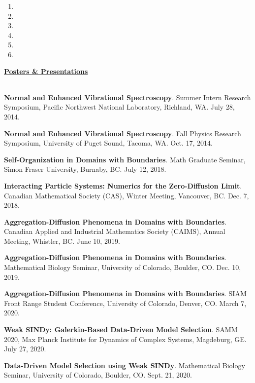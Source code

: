 \documentclass[letterpaper,11pt,oneside]{article}
\newcommand{\headr}[1]{\vspace{10pt}\uline{\Large{\textbf{#1}} \hfill } \\ \vspace{-10pt}\\}
\begin{document}
\begin{enumerate}
\item {}
\item {}
\item {}
\item {}
\item {}
\item {}
\end{enumerate}


%

\headr{Posters \& Presentations}

\begin{enumerate}[label={[\arabic*]}]
\item \textbf{Normal and Enhanced Vibrational Spectroscopy}. Summer Intern Research Symposium, Pacific Northwest National Laboratory, Richland, WA. July 28, 2014.
\item \textbf{Normal and Enhanced Vibrational Spectroscopy}. Fall Physics Research Symposium, University of Puget Sound, Tacoma, WA. Oct. 17, 2014.
\item \textbf{Self-Organization in Domains with Boundaries}. Math Graduate Seminar, Simon Fraser University, Burnaby, BC. July 12, 2018.
\item \textbf{Interacting Particle Systems: Numerics for the Zero-Diffusion Limit}. Canadian Mathematical Society (CAS), Winter Meeting, Vancouver, BC. Dec. 7, 2018.
\item \textbf{Aggregation-Diffusion Phenomena in Domains with Boundaries}. Canadian Applied and Industrial Mathematics Society (CAIMS), Annual Meeting, Whistler, BC. June 10, 2019.
\item \textbf{Aggregation-Diffusion Phenomena in Domains with Boundaries}. Mathematical Biology Seminar, University of Colorado, Boulder, CO. Dec. 10, 2019.
\item \textbf{Aggregation-Diffusion Phenomena in Domains with Boundaries}. SIAM Front Range Student Conference, University of Colorado, Denver, CO. March 7, 2020.
\item \textbf{Weak SINDy: Galerkin-Based Data-Driven Model Selection}. SAMM 2020, Max Planck Institute for Dynamics of Complex Systems, Magdeburg, GE. July 27, 2020.
\item \textbf{Data-Driven Model Selection using Weak SINDy}. Mathematical Biology Seminar, University of Colorado, Boulder, CO. Sept. 21, 2020.

\end{enumerate}
\end{document}
